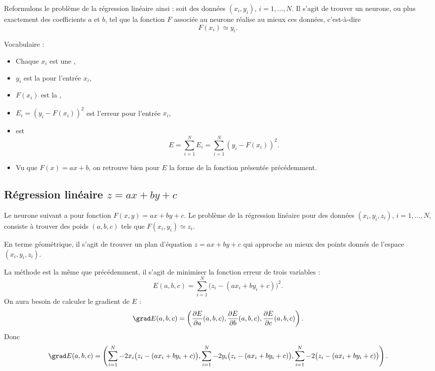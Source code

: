 \documentclass[10pt,class=report,crop=false]{standalone}
\begin{document}
Reformulons le problème de la régression linéaire ainsi : soit des données $(x_i,y_i)$, $i=1,\ldots,N$. Il s'agit de trouver un neurone, ou plus exactement des coefficients $a$ et $b$, tel que la fonction $F$ associée au neurone réalise au mieux ces données, c'est-à-dire 
$$F(x_i) \simeq y_i.$$

Vocabulaire :
\begin{itemize}
  \item Chaque $x_i$ est une ,
  \item $y_i$ est la  pour l'entrée $x_i$,
  \item $F(x_i)$ est la ,
  \item $E_i = (y_i - F(x_i))^2$ est l'erreur pour l'entrée $x_i$,
  \item {} est $$E = \sum_{i=1}^N E_i =  \sum_{i=1}^N(y_i - F(x_i))^2.$$
  \item Vu que $F(x)=ax+b$, on retrouve bien pour $E$ la forme de la fonction présentée précédemment.
\end{itemize}


\subsection{Régression linéaire $z=ax+by+c$}

Le neurone suivant a pour fonction $F(x,y) = ax+by+c$.
Le problème de la régression linéaire pour des données $(x_i,y_i,z_i)$,  $i=1,\ldots,N$, consiste à trouver des poids $(a,b,c)$ tels que $F(x_i,y_i) \simeq z_i$.


En terme géométrique, il s'agit de trouver un plan d'équation $z=ax+by+c$ qui approche au mieux des points donnés de l'espace $(x_i,y_i,z_i)$. 



La méthode est la même que précédemment, il s'agit de minimiser la fonction erreur de trois variables :
$$E(a,b,c) = \sum_{i=1}^N \big(z_i - (ax_i+by_i+c)\big)^2.$$
On aura besoin de calculer le gradient de $E$ :
$$\grad E(a,b,c) 
= \left(\frac{\partial E}{\partial a}(a,b,c), \frac{\partial E}{\partial b}(a,b,c), \frac{\partial E}{\partial c}(a,b,c)\right).$$
Donc 
{\small
$$\grad E(a,b,c) 
= \left(
\sum_{i=1}^{N} -2x_i\big(z_i - (ax_i+by_i+c)\big),  
\sum_{i=1}^{N} -2y_i\big(z_i - (ax_i+by_i+c)\big), 
\sum_{i=1}^{N} -2\big(z_i - (ax_i+by_i+c)\big)
\right).$$
}
\end{document}
